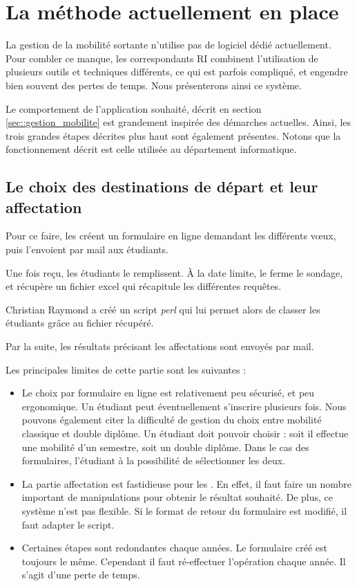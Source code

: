 
		\section{La méthode actuellement en place}
	

La gestion de la mobilité sortante n'utilise pas de logiciel dédié actuellement. Pour combler ce manque, les correspondants RI combinent l'utilisation de plusieurs outils et techniques différents, ce qui est parfois compliqué, et engendre bien souvent des pertes de temps. Nous présenterons ainsi ce système.



Le comportement de l'application souhaité, décrit en section \ref{sec::gestion_mobilite} est grandement inspirée des démarches actuelles. Ainsi, les trois grandes étapes décrites plus haut sont également présentes. Notons que la fonctionnement  décrit est celle utilisée au département informatique.  
 \subsection{Le choix des destinations de départ et leur affectation}
		 
		Pour ce faire, les \ris créent un formulaire en ligne demandant les différents vœux, puis l'envoient par mail aux étudiants. 
		
		Une fois reçu, les étudiants le remplissent. À la date limite, le \ri ferme le sondage, et récupère un fichier excel qui récapitule les différentes requêtes. 
		
		Christian Raymond a créé un script \textit{perl} qui lui permet alors de classer les étudiants grâce au fichier récupéré.
		
		Par la suite, les résultats  précisant les affectations sont envoyés par mail. 
		
		\medbreak
		
		Les principales limites de cette partie sont les suivantes : 
		\begin{itemize}
		\item Le choix par formulaire en ligne est relativement peu sécurisé, et peu ergonomique. Un étudiant peut  éventuellement s'inscrire plusieurs fois. Nous pouvons également citer la difficulté de gestion du choix entre mobilité classique et double diplôme. Un étudiant doit pouvoir choisir : soit il effectue une mobilité d'un semestre, soit un double diplôme. Dans le cas des formulaires, l'étudiant à la possibilité de sélectionner les deux. 
		\item La partie affectation est fastidieuse  pour les \ris. En effet, il faut faire un nombre important de manipulations pour obtenir le résultat  souhaité. De plus, ce système n'est pas flexible. Si le format de retour du formulaire est modifié, il faut adapter le script. 
		\item Certaines étapes sont redondantes chaque années. Le formulaire créé est toujours le même. Cependant il faut ré-effectuer l'opération chaque année. Il s'agit d'une perte de temps. 
		\end{itemize}

